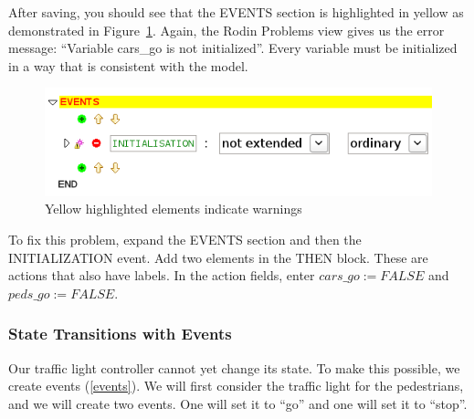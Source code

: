 
After saving, you should see that the \textsf{EVENTS} section is highlighted in yellow as demonstrated in Figure~\ref{fig_tut_03_warning}.  Again, the \textsf{Rodin Problems} view gives us the error message: ``Variable cars\_go is not initialized''. Every variable must be initialized in a way that is consistent with the model.

\begin{figure}[!ht]
\begin{center}
	\includegraphics[]{img/tutorial/tut_03_yellow.png}
	\caption{Yellow highlighted elements indicate warnings}
	\label{fig_tut_03_warning}
\end{center}
\end{figure}

To fix this problem, expand the \textsf{EVENTS} section and then the INITIALIZATION event.  Add two elements in the \textsf{THEN} block.  These are actions that also have labels.  In the action fields, enter $cars\_go :=  FALSE$ and $peds\_go :=  FALSE$.


\subsubsection{State Transitions with Events}

Our traffic light controller cannot yet change its state.  To make this possible, we create events (\ref{events}). We will first consider the traffic light for the pedestrians, and we will create two events. One will set it to ``go'' and one will set it to ``stop''.

